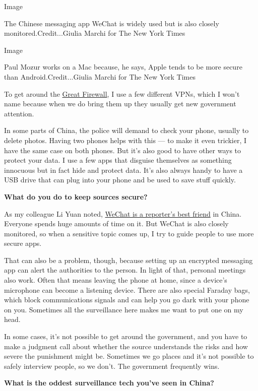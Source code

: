 Image

The Chinese messaging app WeChat is widely used but is also closely
monitored.Credit...Giulia Marchi for The New York Times

Image

Paul Mozur works on a Mac because, he says, Apple tends to be more
secure than Android.Credit...Giulia Marchi for The New York Times

To get around the
\href{https://www.nytimes.com/2018/08/10/technology/tech-infowars-china-great-firewall.html}{Great
Firewall}, I use a few different VPNs, which I won't name because when
we do bring them up they usually get new government attention.

In some parts of China, the police will demand to check your phone,
usually to delete photos. Having two phones helps with this --- to make
it even trickier, I have the same case on both phones. But it's also
good to have other ways to protect your data. I use a few apps that
disguise themselves as something innocuous but in fact hide and protect
data. It's also always handy to have a USB drive that can plug into your
phone and be used to save stuff quickly.

\textbf{What do you do to keep sources secure?}

As my colleague Li Yuan noted,
\href{https://www.nytimes.com/2019/01/09/technology/personaltech/china-wechat.html}{WeChat
is a reporter's best friend} in China. Everyone spends huge amounts of
time on it. But WeChat is also closely monitored, so when a sensitive
topic comes up, I try to guide people to use more secure apps.

That can also be a problem, though, because setting up an encrypted
messaging app can alert the authorities to the person. In light of that,
personal meetings also work. Often that means leaving the phone at home,
since a device's microphone can become a listening device. There are
also special Faraday bags, which block communications signals and can
help you go dark with your phone on you. Sometimes all the surveillance
here makes me want to put one on my head.

In some cases, it's not possible to get around the government, and you
have to make a judgment call about whether the source understands the
risks and how severe the punishment might be. Sometimes we go places and
it's not possible to safely interview people, so we don't. The
government frequently wins.

\textbf{What is the oddest surveillance tech you've seen in China?}

